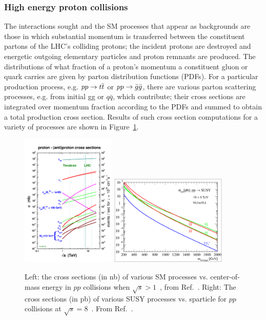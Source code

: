 \subsubsection{High energy proton collisions}
The interactions sought and the SM processes that appear as backgrounds are those in 
which substantial momentum is transferred between the constituent partons of the LHC's 
colliding protons; the incident protons are destroyed and energetic outgoing elementary 
particles and proton remnants are produced. The distributions of what fraction of a 
proton's momentum a constituent gluon or quark carries are given by parton distribution 
functions (PDFs). For a particular production process, e.g. $pp \rightarrow \relax{t}\overline{\relax{t}}$ or 
$pp \rightarrow \bar{g}\bar{g}$, there are various parton scattering processes, e.g. 
from initial gg or $q\bar{q}$, which contribute; their cross sections are integrated over momentum fraction according to 
the PDFs and summed to obtain a total production cross section.
Results of such cross section computations for a variety of processes are shown
in Figure~\ref{fig:crossSec}.

\begin{figure}[h!]
  \begin{center}
      \includegraphics[width=0.40\textwidth,trim=0 2cm 0 0]{figures/crosssections2012_v5}
      \includegraphics[width=0.5\textwidth, ]{figures/nlonll_lhc8_tpformat.eps}
      \caption{\label{fig:crossSec} Left: the cross sections (in nb) of various SM processes vs. center-of-mass
              energy in $pp$ collisions when $\sqrt{s}>1$~\TeV, from Ref.~\cite{stirling-xs}. Right: 
              The cross sections (in pb) of various SUSY processes vs. sparticle for $pp$ collisions
              at $\sqrt{s}=8$~\TeV. From Ref.~\cite{Beenakker:1996ed}.} 
  \end{center}
\end{figure}

